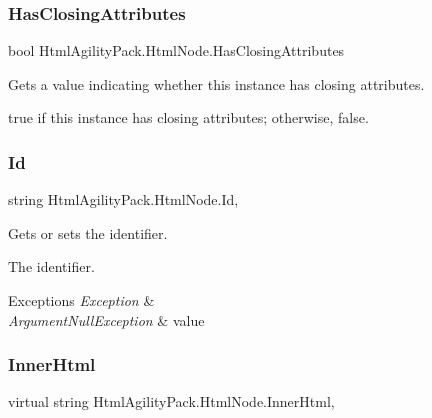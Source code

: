 \subsubsection{\texorpdfstring{Has\+Closing\+Attributes}{HasClosingAttributes}}
{\footnotesize\ttfamily bool Html\+Agility\+Pack.\+Html\+Node.\+Has\+Closing\+Attributes\hspace{0.3cm}{\ttfamily [get]}}



Gets a value indicating whether this instance has closing attributes. 

{\ttfamily true} if this instance has closing attributes; otherwise, {\ttfamily false}.\mbox{\label{class_html_agility_pack_1_1_html_node_a8d32bc2ec79d6bd945618068c0e5527b}} 
\subsubsection{\texorpdfstring{Id}{Id}}
{\footnotesize\ttfamily string Html\+Agility\+Pack.\+Html\+Node.\+Id\hspace{0.3cm}{\ttfamily [get]}, {\ttfamily [set]}}



Gets or sets the identifier. 

The identifier.


\begin{DoxyExceptions}{Exceptions}
{\em Exception} & \\
\hline
{\em Argument\+Null\+Exception} & value\\
\hline
\end{DoxyExceptions}
\mbox{\label{class_html_agility_pack_1_1_html_node_a14604670771b05a2cf2d7a54d2fbb27f}} 
\subsubsection{\texorpdfstring{Inner\+Html}{InnerHtml}}
{\footnotesize\ttfamily virtual string Html\+Agility\+Pack.\+Html\+Node.\+Inner\+Html\hspace{0.3cm}{\ttfamily [get]}, {\ttfamily [set]}}



